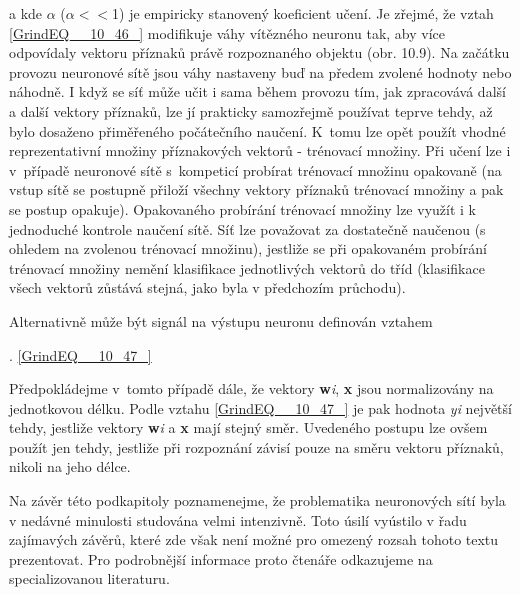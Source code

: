 \noindent a kde $\alpha$ ($\alpha$$<$$<$1) je empiricky stanovený koeficient učení. Je zřejmé, že vztah \eqref{GrindEQ__10_46_} modifikuje váhy vítězného neuronu tak, aby více odpovídaly vektoru příznaků právě rozpoznaného objektu (obr. 10.9). Na začátku provozu neuronové sítě jsou váhy nastaveny buď na předem zvolené hodnoty nebo náhodně. I když se síť může učit i sama během provozu tím, jak zpracovává další a další vektory příznaků, lze jí prakticky samozřejmě používat teprve tehdy, až bylo dosaženo přiměřeného počátečního naučení. K~tomu lze opět použít vhodné reprezentativní množiny příznakových vektorů - trénovací množiny. Při učení lze i v~případě neuronové sítě s~kompeticí probírat trénovací množinu opakovaně (na vstup sítě se postupně přiloží všechny vektory příznaků trénovací množiny a pak se postup opakuje). Opakovaného probírání trénovací množiny lze využít i k jednoduché kontrole naučení sítě. Síť lze považovat za dostatečně naučenou (s ohledem na zvolenou trénovací množinu), jestliže se při opakovaném probírání trénovací množiny nemění klasifikace jednotlivých vektorů do tříd (klasifikace všech vektorů zůstává stejná, jako byla v předchozím průchodu).

\noindent 

\noindent 

\noindent Alternativně může být signál na výstupu neuronu definován vztahem

 . \eqref{GrindEQ__10_47_}

\noindent Předpokládejme v~tomto případě dále, že vektory \textbf{w}\textit{i}, \textbf{x} jsou normalizovány na jednotkovou délku. Podle vztahu \eqref{GrindEQ__10_47_} je pak hodnota \textit{yi} největší tehdy, jestliže vektory \textbf{w}\textit{i} a \textbf{x} mají stejný směr. Uvedeného postupu lze ovšem použít jen tehdy, jestliže při rozpoznání závisí pouze na směru vektoru příznaků, nikoli na jeho délce.

\noindent 

\noindent Na závěr této podkapitoly poznamenejme, že problematika neuronových sítí byla v nedávné minulosti studována velmi intenzivně. Toto úsilí vyústilo v řadu zajímavých závěrů, které zde však není možné pro omezený rozsah tohoto textu prezentovat. Pro podrobnější informace proto čtenáře odkazujeme na specializovanou literaturu.
